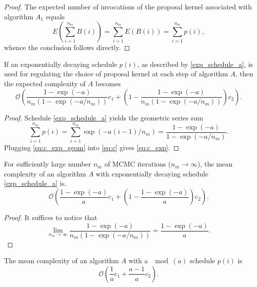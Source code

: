 \documentclass[twoside,11pt]{article}
\begin{document}
\begin{proof}
The expected number of invocations of the proposal kernel associated with algorithm $A_1$ equals 
\begin{equation*}
E\left(\sum_{i=1}^{n_m}B(i)\right)=\sum_{i=1}^{n_m}E(B(i))=\sum_{i=1}^{n_m}p(i),
\end{equation*}
whence the conclusion follows directly.
\end{proof}

\begin{proposition}
If an exponentially decaying schedule $p(i)$, as described by \eqref{exp_schedule_a}, is used for regulating the choice of 
proposal kernel at each step of algorithm $A$, then the expected complexity of $A$ becomes
\begin{equation}
\label{eq:c_exp}
\mathcal{O}\left(
\dfrac{1-\exp{(-a)}}{n_m(1-\exp{(-a/n_m)})}c_1+
\left(1-\dfrac{1-\exp{(-a)}}{n_m(1-\exp{(-a/n_m)})}\right)c_2
\right).
\end{equation}
\end{proposition}

\begin{proof}
Schedule \eqref{exp_schedule_a} yields the geometric series sum
\begin{equation}
\label{eq:c_exp_geom}
\sum_{i=1}^{n_m}p(i)=
\sum_{i=1}^{n_m}\exp{(-a(i-1)/n_m)}=
\dfrac{1-\exp{(-a)}}{1-\exp{(-a/n_m)}}.
\end{equation}
Plugging \eqref{eq:c_exp_geom} into \eqref{eq:c} gives \eqref{eq:c_exp}.
\end{proof}

\begin{lemma}
For sufficiently large number $n_m$ of MCMC iterations ($n_m\rightarrow\infty$), the mean complexity of an algorithm $A$ 
with exponentially decaying schedule \eqref{exp_schedule_a} is.
\begin{equation}
\label{eq:c_exp_limit}
\mathcal{O}\left(
\dfrac{1-\exp{(-a)}}{a}c_1+
\left(1-\dfrac{1-\exp{(-a)}}{a}\right)c_2
\right).
\end{equation}
\end{lemma}

\begin{proof}
It suffices to notice that
\begin{equation}
\lim_{n_m\to\infty}\dfrac{1-\exp{(-a)}}{n_m(1-\exp{(-a/n_m)})}=\dfrac{1-\exp{(-a)}}{a}.
\end{equation}
\end{proof}

\begin{proposition}
The mean complexity of an algorithm $A$ with a $\mod{(a)}$ schedule $p(i)$ is
\begin{equation}
\label{eq:c_mod}
\mathcal{O}\left(
\dfrac{1}{a}c_1+
\dfrac{a-1}{a} c_2
\right).
\end{equation}
\end{proposition}
\end{document}
